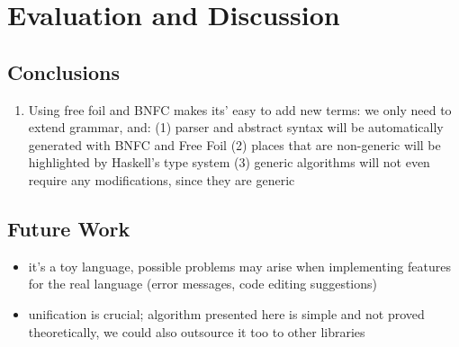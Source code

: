 \chapter{Evaluation and Discussion}
\label{chap:evaluation}



\section{Conclusions}

\begin{enumerate}
  \item Using free foil and BNFC makes its' easy to add new terms: we only need to extend grammar, and: (1) parser and abstract syntax will be automatically generated with BNFC and Free Foil (2) places that are non-generic will be highlighted by Haskell's type system (3) generic algorithms will not even require any modifications, since they are generic
\end{enumerate}

\section{Future Work}

\begin{itemize}
  \item it's a toy language, possible problems may arise when implementing features for the real language (error messages, code editing suggestions)
  \item unification is crucial; algorithm presented here is simple and not proved theoretically, we could also outsource it too to other libraries
\end{itemize}

